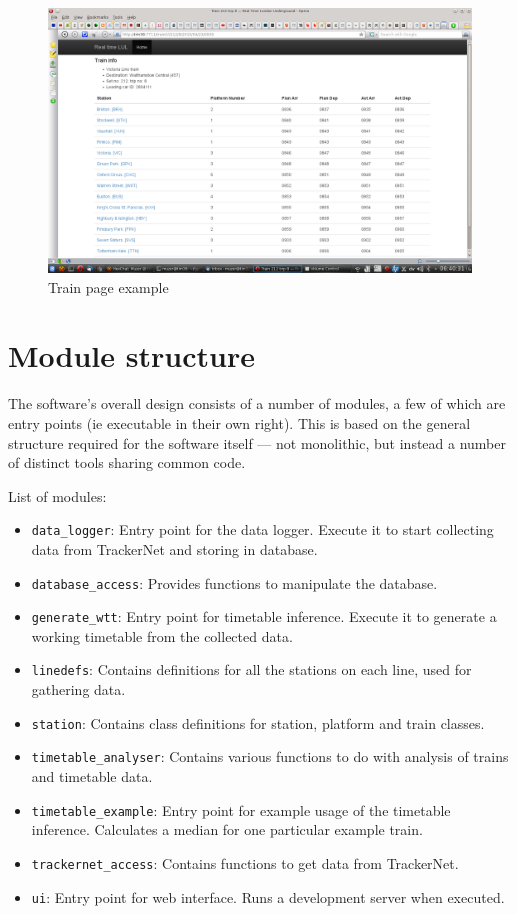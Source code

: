 \documentclass[a4paper,12pt,twoside]{report}
\begin{document}
\begin{figure}[h]
  \centering
  \includegraphics[width=\linewidth]{sshot2}
  \caption{Train page example}
  \label{fig:sshot2}
\end{figure}

\section{Module structure}

The software's overall design consists of a number of modules, a few of which
are entry points (ie executable in their own right). This is based on the
general structure required for the software itself --- not monolithic, but
instead a number of distinct tools sharing common code.

List of modules:
\begin{itemize}
  \item \texttt{data\_logger}: Entry point for the data logger. Execute it to
    start collecting data from TrackerNet and storing in database.
  \item \texttt{database\_access}: Provides functions to manipulate the
    database.
  \item \texttt{generate\_wtt}: Entry point for timetable inference. Execute it
    to generate a working timetable from the collected data.
  \item \texttt{linedefs}: Contains definitions for all the stations on each
    line, used for gathering data.
  \item \texttt{station}: Contains class definitions for station, platform and
    train classes.
  \item \texttt{timetable\_analyser}: Contains various functions to do with
    analysis of trains and timetable data.
  \item \texttt{timetable\_example}: Entry point for example usage of the
    timetable inference. Calculates a median for one particular example train.
  \item \texttt{trackernet\_access}: Contains functions to get data from
    TrackerNet.
  \item \texttt{ui}: Entry point for web interface. Runs a development server
    when executed.
\end{itemize}
\end{document}
